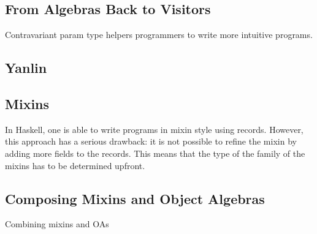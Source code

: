 \subsection{From Algebras Back to Visitors}

Contravariant param type helpers programmers to write more intuitive programs.

\subsection{Yanlin}


\subsection{Mixins}

In Haskell, one is able to write programs in mixin style using records. However,
this approach has a serious drawback: it is not possible to refine the mixin by
adding more fields to the records. This means that the type of the family of the
mixins has to be determined upfront.

\subsection{Composing Mixins and Object Algebras}

Combining mixins and OAs
